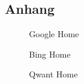 \begin{appendix}
  \section{Anhang}

  \begin{figure}[ht]
    \centering
    \caption{Google Home}\label{fig:google_home}
  \end{figure}
  \begin{figure}[ht]
    \centering
    \caption{Bing Home}\label{fig:bing_home}
  \end{figure}
  \begin{figure}[ht]
    \centering
    \caption{Qwant Home}\label{fig:qwant_home}
  \end{figure}
\end{appendix}